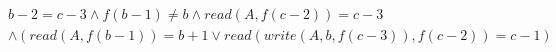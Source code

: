 \begin{align*}
%
& %
b - 2 = c - 3
%
\land
%
f(b - 1)  \neq  b
%
\land
%
\mathit{read}(A,f(c - 2)) = c - 3
~\\~
& %
%
\land
%
(\mathit{read}(A,f(b - 1)) = b + 1 \lor \mathit{read}(\mathit{write}(A,b,f(c - 3)),f(c - 2)) = c - 1)
%
\end{align*}
